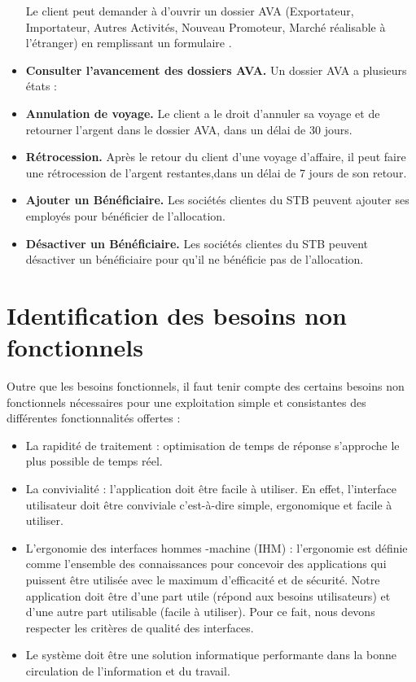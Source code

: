 \begin{itemize}
\begin{itemize}
\begin{itemize}
\end{itemize} %
\end{itemize} %


Le client peut  demander à d'ouvrir un dossier AVA (Exportateur, Importateur, Autres Activités, Nouveau Promoteur, Marché réalisable à l'étranger) en remplissant un formulaire .

\item \textbf{Consulter l'avancement des dossiers AVA.}
Un dossier AVA a plusieurs états :
\item \textbf{Annulation de voyage.} 
Le client a le droit d'annuler sa voyage et de retourner l'argent dans le dossier AVA, dans un délai de 30 jours. 

\item \textbf{Rétrocession.} 
Après le retour du client d'une voyage d'affaire, il peut faire une rétrocession de l'argent restantes,dans un délai de 7 jours de son retour.
\item \textbf{Ajouter un Bénéficiaire.}
Les sociétés clientes du STB peuvent ajouter ses employés pour bénéficier de l'allocation.

\item \textbf{Désactiver un Bénéficiaire.}
Les sociétés clientes du STB peuvent désactiver un bénéficiaire pour qu'il ne bénéficie pas de l'allocation.

\end{itemize}
 
 \section{Identification des besoins non fonctionnels} 
 Outre que les besoins fonctionnels, il faut tenir compte des certains besoins non fonctionnels nécessaires pour une exploitation simple et consistantes des différentes fonctionnalités offertes :
 
 \begin{itemize}
 \item La rapidité de traitement : optimisation de temps de réponse s'approche le plus possible de temps réel.
 
 \item La convivialité : l'application doit être facile à utiliser. En effet, l'interface utilisateur doit être conviviale c'est-à-dire simple, ergonomique et facile à utiliser.
 
 \item L'ergonomie des interfaces hommes -machine (IHM) : l'ergonomie est définie comme l'ensemble des connaissances pour concevoir des applications qui puissent être utilisée avec le maximum d'efficacité et de sécurité. Notre application doit être d'une part utile (répond aux besoins utilisateurs) et d'une autre part utilisable (facile à utiliser).
 Pour ce fait, nous devons respecter les critères de qualité des interfaces.

\item Le système doit être une solution informatique performante dans la bonne circulation de l'information et du travail.
 
 \end{itemize}
